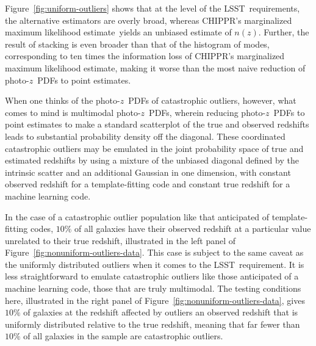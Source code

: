 \documentclass[iop]{emulateapj}
\newcommand{\Fig}[1]{Figure~\ref{#1}}
\newcommand{\project}[1]{\textsc{#1}}
\newcommand{\lsst}{\project{LSST}}
\newcommand{\Chippr}{\project{CHIPPR}}%
\newcommand{\pz}{photo-$z$}
\newcommand{\pzpdf}{\pz\ PDF}%
\newcommand{\nz}{$n(z)$}
\newcommand{\mmle}{marginalized maximum likelihood estimate}%
\begin{document}
\Fig{fig:uniform-outliers} shows that at the level of the \lsst\ requirements, the alternative estimators are overly broad, whereas \Chippr's \mmle\ yields an unbiased estimate of \nz.
Further, the result of stacking is even broader than that of the histogram of modes, corresponding to ten times the information loss of \Chippr's \mmle, making it worse than the most naive reduction of \pzpdf s to point estimates.

When one thinks of the \pzpdf s of catastrophic outliers, however, what comes to mind is multimodal \pzpdf s, wherein reducing \pzpdf s to point estimates to make a standard scatterplot of the true and observed redshifts leads to substantial probability density off the diagonal.
These coordinated catastrophic outliers may be emulated in the joint probability space of true and estimated redshifts by using a mixture of the unbiased diagonal defined by the intrinsic scatter and an additional Gaussian in one dimension, with constant observed redshift for a template-fitting code and constant true redshift for a machine learning code.

In the case of a catastrophic outlier population like that anticipated of template-fitting codes, $10\%$ of all galaxies have their observed redshift at a particular value unrelated to their true redshift, illustrated in the left panel of \Fig{fig:nonuniform-outliers-data}.
This case is subject to the same caveat as the uniformly distributed outliers when it comes to the \lsst\ requirement.
It is less straightforward to emulate catastrophic outliers like those anticipated of a machine learning code, those that are truly multimodal.
The testing conditions here, illustrated in the right panel of \Fig{fig:nonuniform-outliers-data}, gives $10\%$ of galaxies at the redshift affected by outliers an observed redshift that is uniformly distributed relative to the true redshift, meaning that far fewer than $10\%$ of all galaxies in the sample are catastrophic outliers.
\end{document}
